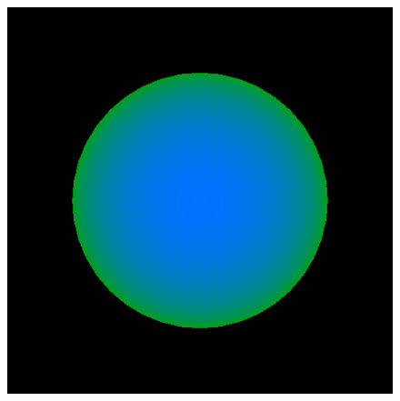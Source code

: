 \documentclass[final,5p,times]{elsarticle}
\begin{document}
\begin{figure}[t]
{        \includegraphics[width=0.27\paperwidth]{figs/bump_1}
        \label{fig:bump_1}
    }
\end{figure}
\end{document}
